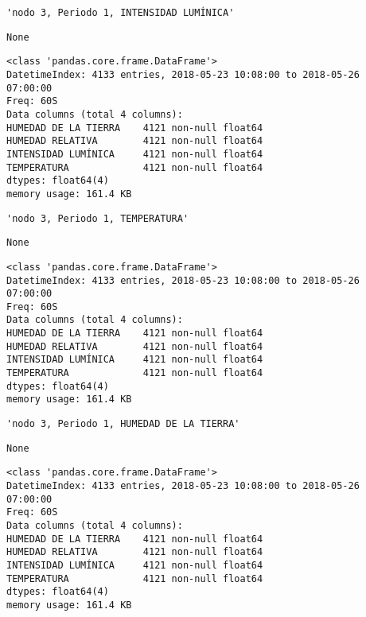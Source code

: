 \documentclass[11pt]{article}
\begin{document}
    
    \begin{verbatim}
'nodo 3, Periodo 1, INTENSIDAD LUMÍNICA'
    \end{verbatim}

    
    
    \begin{verbatim}
None
    \end{verbatim}

    
    \begin{Verbatim}[commandchars=\\\{\}]
<class 'pandas.core.frame.DataFrame'>
DatetimeIndex: 4133 entries, 2018-05-23 10:08:00 to 2018-05-26 07:00:00
Freq: 60S
Data columns (total 4 columns):
HUMEDAD DE LA TIERRA    4121 non-null float64
HUMEDAD RELATIVA        4121 non-null float64
INTENSIDAD LUMÍNICA     4121 non-null float64
TEMPERATURA             4121 non-null float64
dtypes: float64(4)
memory usage: 161.4 KB

    \end{Verbatim}

    
    \begin{verbatim}
'nodo 3, Periodo 1, TEMPERATURA'
    \end{verbatim}

    
    
    \begin{verbatim}
None
    \end{verbatim}

    
    \begin{Verbatim}[commandchars=\\\{\}]
<class 'pandas.core.frame.DataFrame'>
DatetimeIndex: 4133 entries, 2018-05-23 10:08:00 to 2018-05-26 07:00:00
Freq: 60S
Data columns (total 4 columns):
HUMEDAD DE LA TIERRA    4121 non-null float64
HUMEDAD RELATIVA        4121 non-null float64
INTENSIDAD LUMÍNICA     4121 non-null float64
TEMPERATURA             4121 non-null float64
dtypes: float64(4)
memory usage: 161.4 KB

    \end{Verbatim}

    
    \begin{verbatim}
'nodo 3, Periodo 1, HUMEDAD DE LA TIERRA'
    \end{verbatim}

    
    
    \begin{verbatim}
None
    \end{verbatim}

    
    \begin{Verbatim}[commandchars=\\\{\}]
<class 'pandas.core.frame.DataFrame'>
DatetimeIndex: 4133 entries, 2018-05-23 10:08:00 to 2018-05-26 07:00:00
Freq: 60S
Data columns (total 4 columns):
HUMEDAD DE LA TIERRA    4121 non-null float64
HUMEDAD RELATIVA        4121 non-null float64
INTENSIDAD LUMÍNICA     4121 non-null float64
TEMPERATURA             4121 non-null float64
dtypes: float64(4)
memory usage: 161.4 KB

    \end{Verbatim}
\end{document}
